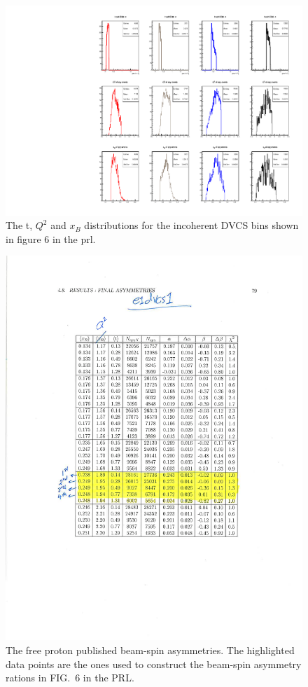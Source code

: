 \documentclass[a4paper,11pt,twoside]{article}
\begin{document}
\begin{enumerate}
\begin{figure}[h!]
   \includegraphics[width=14.9cm]{t_InCoh_bins.pdf}
   \caption{The t, $Q^2$ and $x_{B}$ distributions for the incoherent DVCS bins 
   shown in figure 6 in the prl.}
\label{fig:incoh-kin}
\end{figure}

\begin{figure}[h!]
\includegraphics[width=14.9cm]{e1dvcs1_free_proton_alu.pdf}
   \caption{The free proton published beam-spin asymmetries. The highlighted 
   data points are the ones used to construct the beam-spin asymmetry rations 
   in FIG.~6 in the PRL.}
\label{fig:free-p}
\end{figure}




\end{enumerate}
\end{document}
